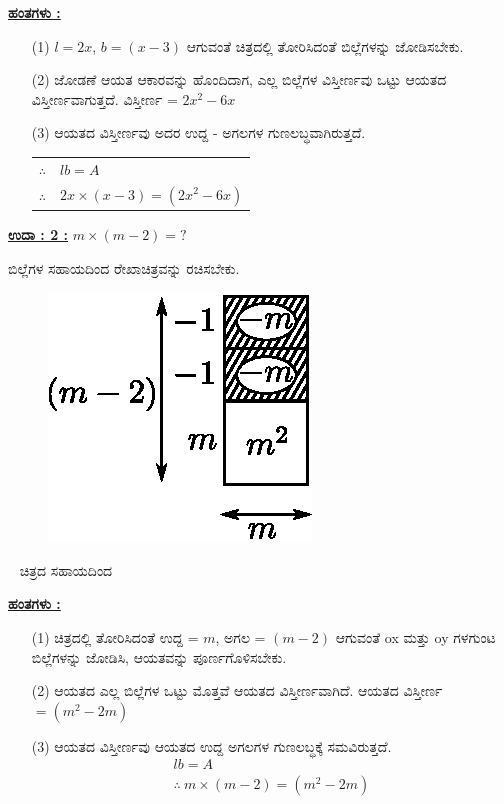 \noindent
{\textbf{\underline{ಹಂತಗಳು :}}} 
\begin{itemize}
\item [(1)] $l = 2x$, $b = (x-3)$ ಆಗುವಂತೆ ಚಿತ್ರದಲ್ಲಿ ತೋರಿಸಿದಂತೆ ಬಿಲ್ಲೆಗಳನ್ನು ಜೋಡಿಸಬೇಕು. 
\item [(2)] ಜೋಡಣೆ ಆಯತ ಆಕಾರವನ್ನು ಹೊಂದಿದಾಗ, ಎಲ್ಲ ಬಿಲ್ಲೆಗಳ ವಿಸ್ತೀರ್ಣವು ಒಟ್ಟು ಆಯತದ ವಿಸ್ತೀರ್ಣವಾಗುತ್ತದೆ. ವಿಸ್ತೀರ್ಣ = $2x^2 - 6x$
\item [(3)] ಆಯತದ ವಿಸ್ತೀರ್ಣವು ಅದರ ಉದ್ದ - ಅಗಲಗಳ ಗುಣಲಬ್ಧವಾಗಿರುತ್ತದೆ. 

\begin{tabular}{ll}
$\therefore$ & $lb = A$\\
$\therefore$ & $2x \times (x - 3) = (2x^2 - 6x)$
\end{tabular}

\end{itemize}

\eject

\noindent
{\textbf{\underline{ಉದಾ : 2 :}}} $m \times (m - 2) = ?$

ಬಿಲ್ಲೆಗಳ ಸಹಾಯದಿಂದ ರೇಖಾಚಿತ್ರವನ್ನು ರಚಿಸಬೇಕು.
\begin{figure}[H]
\centering
\includegraphics[scale=0.8]{src/figure/chap3/fig3-30b.eps}
\end{figure}
~
\vskip -0.5cm
ಚಿತ್ರದ ಸಹಾಯದಿಂದ

\noindent
{\textbf{\underline{ಹಂತಗಳು :}}} 
\begin{itemize}
\item [(1)] ಚಿತ್ರದಲ್ಲಿ ತೋರಿಸಿದಂತೆ ಉದ್ದ = $m$, ಅಗಲ = $(m - 2)$ ಆಗುವಂತೆ ox ಮತ್ತು oy ಗಳಗುಂಟ ಬಿಲ್ಲೆಗಳನ್ನು ಜೋಡಿಸಿ, ಆಯತವನ್ನು ಪೂರ್ಣಗೊಳಿಸಬೇಕು.
\item [(2)] ಆಯತದ ಎಲ್ಲ ಬಿಲ್ಲೆಗಳ ಒಟ್ಟು ಮೊತ್ತವೆ ಆಯತದ ವಿಸ್ತೀರ್ಣವಾಗಿದೆ. ಆಯತದ ವಿಸ್ತೀರ್ಣ $= (m^2 - 2m)$
\item [(3)] ಆಯತದ ವಿಸ್ತೀರ್ಣವು ಆಯತದ ಉದ್ದ ಅಗಲಗಳ ಗುಣಲಬ್ಧಕ್ಕೆ ಸಮವಿರುತ್ತದೆ.
\begin{gather*}
lb = A\\
\therefore~ m \times (m - 2) = (m^2 - 2m)
\end{gather*}

\end{itemize}

